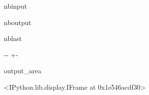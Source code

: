 \documentclass[letterpaper,10pt,english]{sphinxmanual}
\begin{document}
\begin{sphinxuseclass}{nbinput}
{
\begin{sphinxVerbatim}[commandchars=\\\{\}]
\llap{\color{nbsphinxin}[10]:\,\hspace{\fboxrule}\hspace{\fboxsep}}
                                    
\end{sphinxVerbatim}
}

\end{sphinxuseclass}
\begin{sphinxuseclass}{nboutput}
\begin{sphinxuseclass}{nblast}
{

\kern-\sphinxverbatimsmallskipamount\kern-\baselineskip
\kern+\FrameHeightAdjust\kern-\fboxrule
\vspace{\nbsphinxcodecellspacing}

\begin{sphinxuseclass}{output_area}
\begin{sphinxuseclass}{}


\begin{sphinxVerbatim}[commandchars=\\\{\}]
<IPython.lib.display.IFrame at 0x1e546acdf30>
\end{sphinxVerbatim}



\end{sphinxuseclass}
\end{sphinxuseclass}
}

\end{sphinxuseclass}
\end{sphinxuseclass}
\end{document}
